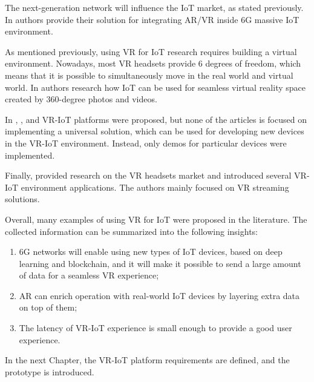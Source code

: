 The next-generation network will influence the IoT market, as stated previously. In \cite{liao_information-centric_2021} authors provide their solution for integrating AR/VR inside 6G massive IoT environment.

As mentioned previously, using VR for IoT research requires building a virtual environment. Nowadays, most VR headsets provide 6 degrees of freedom, which means that it is possible to simultaneously move in the real world and virtual world. In \cite{you_internet_2018} authors research how IoT can be used for seamless virtual reality space created by 360-degree photos and videos.

In \cite{myeong-in_choi_design_2017}, \cite{simiscuka_synchronisation_2018}, \cite{simiscuka_real-virtual_2019} and \cite{krishnan_performance_2020} VR-IoT platforms were proposed, but none of the articles is focused on implementing a universal solution, which can be used for developing new devices in the VR-IoT environment. Instead, only demos for particular devices were implemented.

Finally, \cite{hu_virtual_2021} provided research on the VR headsets market and introduced several VR-IoT environment applications. The authors mainly focused on VR streaming solutions.

Overall, many examples of using VR for IoT were proposed in the literature. The collected information can be summarized into the following insights:
\begin{enumerate}
    \item 6G networks will enable using new types of IoT devices, based on deep learning and blockchain, and it will make it possible to send a large amount of data for a seamless VR experience;
    \item AR can enrich operation with real-world IoT devices by layering extra data on top of them;
    \item The latency of VR-IoT experience is small enough to provide a good user experience.
\end{enumerate}

In the next Chapter, the VR-IoT platform requirements are defined, and the prototype is introduced.